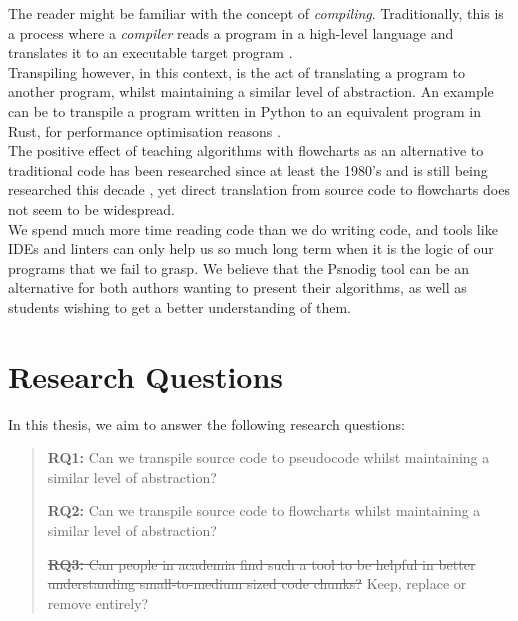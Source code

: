 The reader might be familiar with the concept of \textit{compiling}. Traditionally, this is a process where a \textit{compiler} reads a program in a high-level language and translates it to an executable target program \cite{DBLP:books/aw/AhoSU86}. \hfill \\

Transpiling however, in this context, is the act of translating a program to another program, whilst maintaining a similar level of abstraction. An example can be to transpile a program written in Python to an equivalent program in Rust, for performance optimisation reasons \cite{DBLP:conf/samos/LunnikiviJ020}. \hfill \\

The positive effect of teaching algorithms with flowcharts as an alternative to traditional code has been researched since at least the 1980's and is still being researched this decade \cite{DBLP:journals/software/Scanlan89}\cite{7096016}\cite{flowchartsHighschool}, yet direct translation from source code to flowcharts does not seem to be widespread. \hfill \\

We spend much more time reading code than we do writing code\cite[14]{martin2008clean}, and tools like IDEs and linters can only help us so much long term when it is the logic of our programs that we fail to grasp. We believe that the Psnodig tool can be an alternative for both authors wanting to present their algorithms, as well as students wishing to get a better understanding of them.


\section{Research Questions}

In this thesis, we aim to answer the following research questions: \hfill \\

\begin{quote}
    \textbf{RQ1:} Can we transpile source code to pseudocode whilst maintaining a similar level of abstraction?

    \textbf{RQ2:} Can we transpile source code to flowcharts whilst maintaining a similar level of abstraction?

    \sout{\textbf{RQ3:} Can people in academia find such a tool to be helpful in better understanding small-to-medium sized code chunks?} Keep, replace or remove entirely?
\end{quote}


